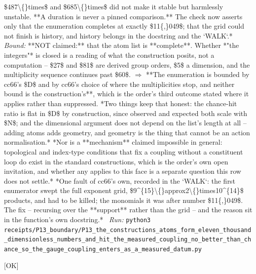 \begin{description}
\$487\textbackslash\{\}times\$ and \$685\textbackslash\{\}times\$ did not make it stable but harmlessly unstable. **A duration is never a pinned comparison.** The check now asserts only that the enumeration completes at exactly \$11\{,\}049\$; that the grid could not finish is history, and history belongs in the docstring and the `WALK`.*
 \emph{Bound:} **NOT claimed:** that the atom list is **complete**. Whether *"the integers"* is closed is a reading of what the construction posits, not a computation -- \$27\$ and \$81\$ are derived group orders, \$5\$ a dimension, and the multiplicity sequence continues past \$60\$. \ensuremath{\Rightarrow} **The enumeration is bounded by cc66's \$D\$ and by cc66's choice of where the multiplicities stop, and neither bound is the construction's**, which is the order's third outcome stated where it applies rather than suppressed.  *Two things keep that honest: the chance-hit ratio is flat in \$D\$ by construction, since observed and expected both scale with \$N\$; and the dimensional argument does not depend on the list's length at all -- adding atoms adds geometry, and geometry is the thing that cannot be an action normalisation.*  *Nor is a **mechanism** claimed impossible in general: topological and index-type conditions that fix a coupling without a constituent loop do exist in the standard constructions, which is the order's own open invitation, and whether any applies to this face is a separate question this row does not settle.*  *One fault of cc66's own, recorded in the `WALK`: the first enumerator swept the full exponent grid, \$9\textasciicircum{}\{15\}\textbackslash\{\}approx2\textbackslash\{\}times10\textasciicircum{}\{14\}\$ products, and had to be killed; the monomials it was after number \$11\{,\}049\$. The fix -- recursing over the **support** rather than the grid -- and the reason sit in the function's own docstring.*
\ \emph{Run:} \texttt{python3 receipts/P13\_boundary/P13\_the\_constructions\_atoms\_form\_eleven\_thousand\_dimensionless\_numbers\_and\_hit\_the\_measured\_coupling\_no\_better\_than\_chance\_so\_the\_gauge\_coupling\_enters\_as\_a\_measured\_datum.py}
\item[\label{rcpt:I1_so6C_has_five_real_forms_and_the_omitted_one_admits_su3}\textbf{}\quad\texttt{I1\_so6C\_has\_five\_real\_forms\_and\_the\_omitted\_one\_admits\_su3}]\hfill\textsf{[OK]}\\

\end{description}
